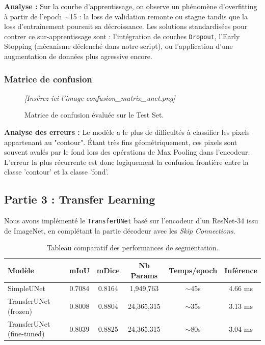 \documentclass[12pt, a4paper]{article}
\begin{document}
\textbf{Analyse :} Sur la courbe d'apprentissage, on observe un phénomène d'overfitting à partir de l'epoch $\sim$15 : la loss de validation remonte ou stagne tandis que la loss d'entraînement poursuit sa décroissance. Les solutions standardisées pour contrer ce sur-apprentissage sont : l'intégration de couches \texttt{Dropout}, l'Early Stopping (mécanisme déclenché dans notre script), ou l'application d'une augmentation de données plus agressive encore.

\subsubsection*{Matrice de confusion}
\begin{figure}[H]
    \centering
    \textit{[Insérez ici l'image confusion\_matrix\_unet.png]}
    \caption{Matrice de confusion évaluée sur le Test Set.}
\end{figure}

\textbf{Analyse des erreurs :} Le modèle a le plus de difficultés à classifier les pixels appartenant au "contour". Étant très fins géométriquement, ces pixels sont souvent avalés par le fond lors des opérations de Max Pooling dans l'encodeur. L'erreur la plus récurrente est donc logiquement la confusion frontière entre la classe 'contour' et la classe 'fond'.

\subsection{Partie 3 : Transfer Learning}
Nous avons implémenté le \texttt{TransferUNet} basé sur l'encodeur d'un ResNet-34 issu de ImageNet, en complétant la partie décodeur avec les \textit{Skip Connections}.

\begin{table}[H]
\centering
\begin{tabular}{@{}lccccc@{}}
\toprule
\textbf{Modèle} & \textbf{mIoU} & \textbf{mDice} & \textbf{Nb Params} & \textbf{Temps/epoch} & \textbf{Inférence} \\ \midrule
SimpleUNet & 0.7084 & 0.8164 & 1,949,763 & $\sim$45s & 4.66 ms \\
TransferUNet (frozen) & 0.8008 & 0.8804 & 24,365,315 & $\sim$35s & 3.13 ms \\
TransferUNet (fine-tuned) & 0.8039 & 0.8825 & 24,365,315 & $\sim$80s & 3.04 ms \\ \bottomrule
\end{tabular}
\caption{Tableau comparatif des performances de segmentation.}
\end{table}
\end{document}
